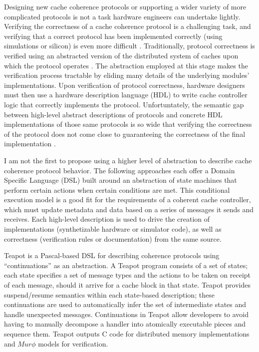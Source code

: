Designing new cache coherence protocols or supporting a wider variety of more complicated protocols is not a task hardware engineers can undertake lightly.
Verifying the correctness of a cache coherence protocol is a challenging task, and
verifying that a correct protocol has been implemented correctly (using simulations or silicon) is even more difficult
\cite{deorio2008post, bentley2001validating, burckhardt2005verifying, clarke1995verification, dill1992protocol, wood1990verifying}.
Traditionally, protocol correctness is verified using an abstracted version of the distributed system of caches upon which the protocol operates
\cite{talupur2008going, delzanno2003constraint, pong1997verification, wood1990verifying, mcmillan2001parameterized}.
The abstraction employed at this stage makes the verification process tractable by eliding many details of the underlying modules' implementations.
Upon verification of protocol correctness, hardware designers must then use a hardware description language (HDL) to write cache controller logic that correctly implements the protocol.
Unfortuntately, the semantic gap between high-level abstract descriptions of protocols and 
concrete HDL implementations of those same protocols is so wide that verifying the correctness of the protocol
does not come close to guaranteeing the correctness of the final implementation \cite{dave-memocode05}.

I am not the first to propose using a higher level of abstraction to describe cache coherence protocol behavior.
The following approaches each offer a Domain Specific Language (DSL)
built around an abstraction of state machines that perform certain actions when certain conditions are met.
This conditional execution model is a good fit for the requirements of a coherent cache controller,
which must update metadata and data based on a series of messages it sends and receives.
Each high-level description is used to drive the creation of implementations (synthetizable hardware or simulator code),
as well as correctness (verification rules or documentation) from the same source.

Teapot \cite{chandra-dsl97, chandra-sigplan96}
is a Pascal-based DSL for describing coherence protocols using ``continuations'' as an abstraction.
A Teapot program consists of a set of states; each state
specifies a set of message types and the actions to be
taken on receipt of each message, should it arrive for a
cache block in that state.
Teapot provides suspend/resume semantics within each state-based description;
these continuations are used to automatically infer the set of intermediate states and handle unexpected messages.
Continuations in Teapot allow developers to avoid having to manually decompose
a handler into atomically executable pieces and sequence them. 
Teapot outputs C code for distributed memory implementations and $Mur\phi$ models for verification.

